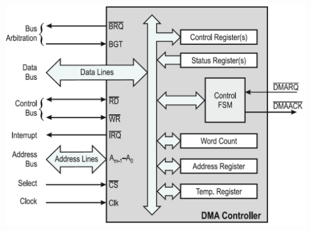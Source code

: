 \begin{minipage}{0.2\linewidth}
    \hspace*{0.1cm}\includegraphics[width=1.6\linewidth]{images/DMAController}
\end{minipage}
    
\clearpage
\pagebreak